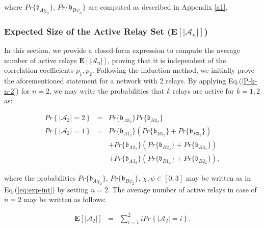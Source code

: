\documentclass[12pt,draftcls, onecolumn]{IEEEtran}
\begin{document}
\noindent where $Pr\{\mathfrak{b}_{A\chi_n}\}$, $Pr\{\mathfrak{b}_{B\psi_n}\}$ are computed as described in Appendix \ref{a1}.   


\vspace{-1pt}

\subsubsection{Expected Size of the Active Relay Set ($\mathbf{E}\left[\left|\mathcal{A}_n\right|\right]$)}
\label{subsec}

In this section, we provide a closed-form expression to compute the average number of active relays $\mathbf{E}\left[\left|\mathcal{A}_n\right|\right]$, proving that it is independent of the correlation coefficients $\rho_1, \rho_2$. Following the induction method, we initially prove the aforementioned statement for a network with 2 relays. By applying Eq.(\ref{P-k-n-2}) for $n=2$, we may write the probabilities that $k$ relays are active for $k=1,2$ as:

\vspace{-2pt}
\begingroup
{\setlength{\arraycolsep}{0em}\begin{eqnarray}
Pr\left\{\left|\mathcal{A}_2\right|=2\right\} &=& Pr\{\mathfrak{b}_{A3_2}\} Pr\{\mathfrak{b}_{B3_2}\} \label{p-2-2}\\
Pr\left\{\left|\mathcal{A}_2\right|=1\right\} &=& Pr\{\mathfrak{b}_{A1_2}\}\left(Pr\{\mathfrak{b}_{B1_2}\}+Pr\{\mathfrak{b}_{B3_2}\}\right)\nonumber\\
&&+Pr\{\mathfrak{b}_{A2_2}\}\left(Pr\{\mathfrak{b}_{B2_2}\}+ Pr\{\mathfrak{b}_{B3_2}\}\right)\nonumber\\
&&+Pr\{\mathfrak{b}_{A3_2}\}\left(Pr\{\mathfrak{b}_{B1_2}\}+Pr\{\mathfrak{b}_{B2_2}\}\right), \label{p-1-2}
\end{eqnarray}}
\endgroup
\vspace{-2pt}

\noindent where the probabilities $ Pr\{\mathfrak{b}_{A\chi_2}\}$, $Pr\{\mathfrak{b}_{B\psi_2}\}$, $\chi,\psi\in [0,3]$ may be written as in Eq.(\ref{eq:exp-int}) by setting $n=2$. The average number of active relays in case of $n=2$ may be written as follows:

\begingroup
\begin{eqnarray}
\label{eq:E-2}
\mathbf{E}\left[\left|\mathcal{A}_2\right|\right] &=& \sum^2_{i=1} iPr\left\{\left|\mathcal{A}_2\right|=i\right\}.
\end{eqnarray}
\endgroup
\end{document}
